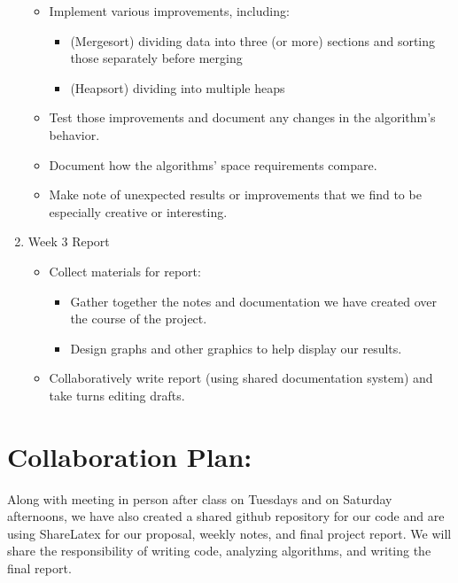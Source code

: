 \documentclass{article}
\begin{document}
\begin{enumerate}
\begin{itemize}
\item Implement various improvements, including: 
\begin{itemize}
\item (Mergesort) dividing data into three (or more) sections and sorting those separately before merging
\item (Heapsort) dividing into multiple heaps
\end{itemize}
\item Test those improvements and document any changes in the algorithm's behavior. 
\item Document how the algorithms' space requirements compare.
\item Make note of unexpected results or improvements that we find to be especially creative or interesting.
\end{itemize}
\item Week 3  Report 
\begin{itemize}
\item Collect materials for report:
\begin{itemize}
\item Gather together the notes and documentation we have created over the course of the project.
\item Design graphs and other graphics to help display our results.
\end{itemize}
\item Collaboratively write report (using shared documentation system) and take turns editing drafts.
\end{itemize}
\end{enumerate}
\section*{Collaboration Plan: }
Along with meeting in person after class on Tuesdays and on Saturday afternoons, we have also created a shared github repository for our code and are using ShareLatex for our proposal, weekly notes, and final project report.  We will share the responsibility of writing code, analyzing algorithms, and writing the final report.
\end{document}
